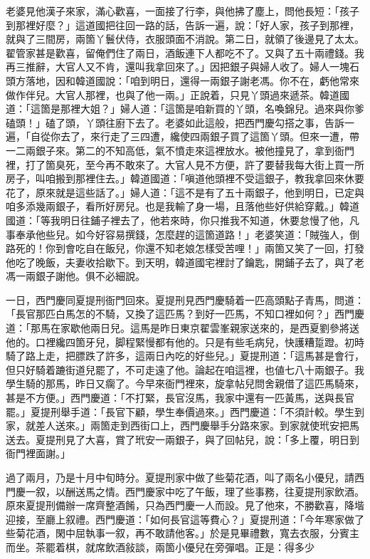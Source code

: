 老婆見他漢子來家，滿心歡喜，一面接了行李，與他拂了塵上，問他長短：「孩子到那裡好麼？」這道國把往回一路的話，告訴一遍，說：「好人家，孩子到那裡，就與了三間房，兩箇丫鬟伏侍，衣服頭面不消說。第二日，就領了後邊見了太太。翟管家甚是歡喜，留俺們住了兩日，酒飯連下人都吃不了。又與了五十兩禮錢。我再三推辭，大官人又不肯，還叫我拿回來了。」因把銀子與婦人收了。婦人一塊石頭方落地，因和韓道國說：「咱到明日，還得一兩銀子謝老馮。你不在，虧他常來做作伴兒。大官人那裡，也與了他一兩。」正說着，只見丫頭過來遞茶。韓道國道：「這箇是那裡大姐？」婦人道：「這箇是咱新買的丫頭，名喚錦兒。過來與你爹磕頭！」磕了頭，丫頭往廚下去了。老婆如此這般，把西門慶勾搭之事，告訴一遍，「自從你去了，來行走了三四遭，纔使四兩銀子買了這箇丫頭。但來一遭，帶一二兩銀子來。第二的不知高低，氣不憤走來這裡放水。被他撞見了，拿到衙門裡，打了箇臭死，至今再不敢來了。大官人見不方便，許了要替我每大街上買一所房子，叫咱搬到那裡住去。」韓道國道：「嗔道他頭裡不受這銀子，教我拿回來休要花了，原來就是這些話了。」婦人道：「這不是有了五十兩銀子，他到明日，已定與咱多添幾兩銀子，看所好房兒。也是我輸了身一場，且落他些好供給穿戴。」韓道國道：「等我明日往鋪子裡去了，他若來時，你只推我不知道，休要怠慢了他，凡事奉承他些兒。如今好容易撰錢，怎麼趕的這箇道路！」{}老婆笑道：「賊強人，倒路死的！你到會吃自在飯兒，你還不知老娘怎樣受苦哩！」兩箇又笑了一回，打發他吃了晚飯，夫妻收拾歇下。到天明，韓道國宅裡討了鑰匙，開鋪子去了，與了老馮一兩銀子謝他。俱不必細說。

一日，西門慶同夏提刑衙門回來。夏提刑見西門慶騎着一匹高頭點子青馬，問道：「長官那匹白馬怎的不騎，又換了這匹馬？到好一匹馬，不知口裡如何？」西門慶道：「那馬在家歇他兩日兒。這馬是昨日東京翟雲峯親家送來的，{}是西夏劉參將送他的。口裡纔四箇牙兒，脚程緊慢都有他的。只是有些毛病兒，快護糟踅蹬。初時騎了路上走，把膘跌了許多，這兩日內吃的好些兒。」夏提刑道：「這馬甚是會行，但只好騎着蹗街道兒罷了，不可走遠了他。論起在咱這裡，也値七八十兩銀子。我學生騎的那馬，昨日又瘸了。今早來衙門裡來，旋拿帖兒問舍親借了這匹馬騎來，甚是不方便。」西門慶道：「不打緊，長官沒馬，我家中還有一匹黃馬，送與長官罷。」夏提刑舉手道：「長官下顧，學生奉價過來。」西門慶道：「不須計較。學生到家，就差人送來。」兩箇走到西街口上，西門慶舉手分路來家。到家就使玳安把馬送去。夏提刑見了大喜，賞了玳安一兩銀子，與了回帖兒，說：「多上覆，明日到衙門裡面謝。」

過了兩月，乃是十月中旬時分。夏提刑家中做了些菊花酒，叫了兩名小優兒，請西門慶一叙，以酬送馬之情。西門慶家中吃了午飯，理了些事務，往夏提刑家飲酒。原來夏提刑備辦一席齊整酒餚，只為西門慶一人而設。見了他來，不勝歡喜，降堦迎接，至廳上叙禮。西門慶道：「如何長官這等費心？」夏提刑道：「今年寒家做了些菊花酒，閑中屈執事一叙，再不敢請他客。」於是見畢禮數，寬去衣服，分賓主而坐。茶罷着棋，就席飲酒敍談，兩箇小優兒在旁彈唱。正是：得多少

